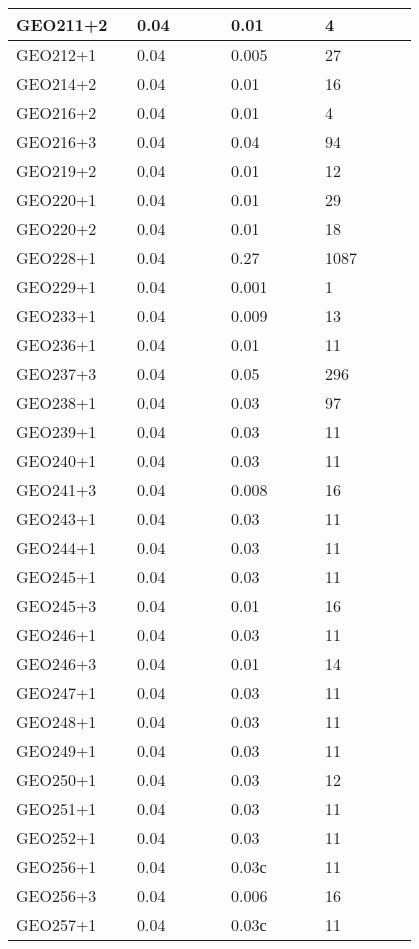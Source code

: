 \begin{longtable}[H]{|p{0.2\linewidth}|p{0.2\linewidth}|p{0.2\linewidth}|p{0.2\linewidth}|}
\hline
GEO211+2 &  0.04 &  0.01 &  4 \\
\hline
GEO212+1 &  0.04 &  0.005 &  27 \\
\hline
GEO214+2 &  0.04 &  0.01 &  16 \\
\hline
GEO216+2 &  0.04 &  0.01 &  4 \\
\hline
GEO216+3 &  0.04 &  0.04 &  94 \\
\hline
GEO219+2 &  0.04 &  0.01 &  12 \\
\hline
GEO220+1 &  0.04 &  0.01 &  29 \\
\hline
GEO220+2 &  0.04 &  0.01 &  18 \\
\hline
GEO228+1 &  0.04 &  0.27 &  1087 \\
\hline
GEO229+1 &  0.04 &  0.001 &  1 \\
\hline
GEO233+1 &  0.04 &  0.009 &  13 \\
\hline
GEO236+1 &  0.04 &  0.01 &  11 \\
\hline
GEO237+3 &  0.04 &  0.05 &  296 \\
\hline
GEO238+1 &  0.04 &  0.03 &  97 \\
\hline
GEO239+1 &  0.04 &  0.03 &  11 \\
\hline
GEO240+1 &  0.04 &  0.03 &  11 \\
\hline
GEO241+3 &  0.04 &  0.008 &  16 \\
\hline
GEO243+1 &  0.04 &  0.03 &  11 \\
\hline
GEO244+1 &  0.04 &  0.03 &  11 \\
\hline
GEO245+1 &  0.04 &  0.03 &  11 \\
\hline
GEO245+3 &  0.04 &  0.01 &  16 \\
\hline
GEO246+1 &  0.04 &  0.03 &  11 \\
\hline
GEO246+3 &  0.04 &  0.01 &  14 \\
\hline
GEO247+1 &  0.04 &  0.03 &  11 \\
\hline
GEO248+1 &  0.04 &  0.03 &  11 \\
\hline
GEO249+1 &  0.04 &  0.03 &  11 \\
\hline
GEO250+1 &  0.04 &  0.03 &  12 \\
\hline
GEO251+1 &  0.04 &  0.03 &  11 \\
\hline
GEO252+1 &  0.04 &  0.03 &  11 \\
\hline
GEO256+1 &  0.04 &  0.03с &  11 \\
\hline
GEO256+3 &  0.04 &  0.006 &  16 \\
\hline
GEO257+1 &  0.04 &  0.03с &  11 \\
\hline

\end{longtable}
